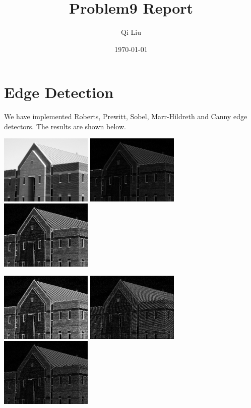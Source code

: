 \documentclass{article}
\title{Problem9 Report}
\author{Qi Liu}
\date{\today}
\begin{document}
\maketitle

\section{Edge Detection}
We have implemented Roberts, Prewitt, Sobel, Marr-Hildreth and Canny edge detectors. The results are shown below.

\includegraphics[width=0.33\textwidth]{../data/building.jpg}
\includegraphics[width=0.33\textwidth]{../data/roberts_building.jpg}
\includegraphics[width=0.33\textwidth]{../data/prewitt_building.jpg}

\includegraphics[width=0.33\textwidth]{../data/sobel_building.jpg}
\includegraphics[width=0.33\textwidth]{../data/marr_hildreth_building.jpg}
\includegraphics[width=0.33\textwidth]{../data/canny_building.jpg}
\end{document}
